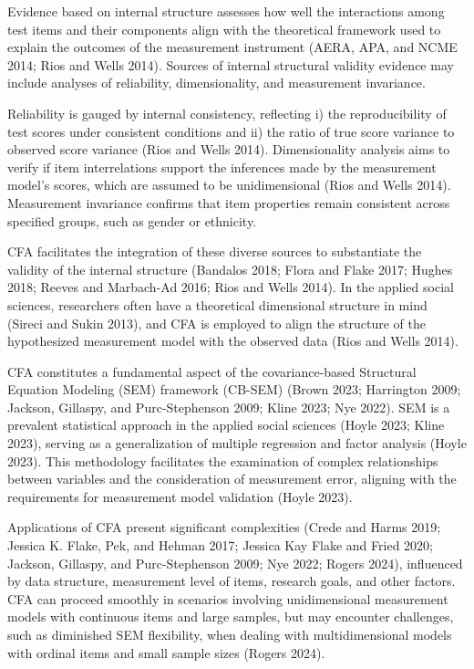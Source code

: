 \documentclass[
  a4paper,
]{article}
\begin{document}
Evidence based on internal structure assesses how well the interactions
among test items and their components align with the theoretical
framework used to explain the outcomes of the measurement instrument
(AERA, APA, and NCME 2014; Rios and Wells 2014). Sources of internal
structural validity evidence may include analyses of reliability,
dimensionality, and measurement invariance.

Reliability is gauged by internal consistency, reflecting i) the
reproducibility of test scores under consistent conditions and ii) the
ratio of true score variance to observed score variance (Rios and Wells
2014). Dimensionality analysis aims to verify if item interrelations
support the inferences made by the measurement model's scores, which are
assumed to be unidimensional (Rios and Wells 2014). Measurement
invariance confirms that item properties remain consistent across
specified groups, such as gender or ethnicity.

CFA facilitates the integration of these diverse sources to substantiate
the validity of the internal structure (Bandalos 2018; Flora and Flake
2017; Hughes 2018; Reeves and Marbach-Ad 2016; Rios and Wells 2014). In
the applied social sciences, researchers often have a theoretical
dimensional structure in mind (Sireci and Sukin 2013), and CFA is
employed to align the structure of the hypothesized measurement model
with the observed data (Rios and Wells 2014).

CFA constitutes a fundamental aspect of the covariance-based Structural
Equation Modeling (SEM) framework (CB-SEM) (Brown 2023; Harrington 2009;
Jackson, Gillaspy, and Purc-Stephenson 2009; Kline 2023; Nye 2022). SEM
is a prevalent statistical approach in the applied social sciences
(Hoyle 2023; Kline 2023), serving as a generalization of multiple
regression and factor analysis (Hoyle 2023). This methodology
facilitates the examination of complex relationships between variables
and the consideration of measurement error, aligning with the
requirements for measurement model validation (Hoyle 2023).

Applications of CFA present significant complexities (Crede and Harms
2019; Jessica K. Flake, Pek, and Hehman 2017; Jessica Kay Flake and
Fried 2020; Jackson, Gillaspy, and Purc-Stephenson 2009; Nye 2022;
Rogers 2024), influenced by data structure, measurement level of items,
research goals, and other factors. CFA can proceed smoothly in scenarios
involving unidimensional measurement models with continuous items and
large samples, but may encounter challenges, such as diminished SEM
flexibility, when dealing with multidimensional models with ordinal
items and small sample sizes (Rogers 2024).
\end{document}
